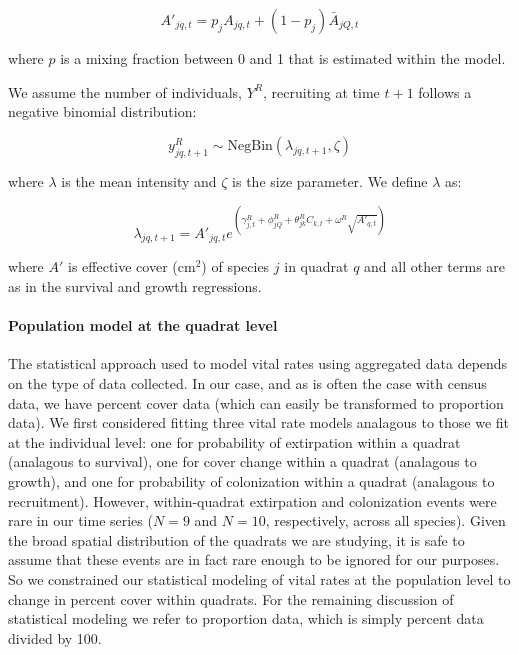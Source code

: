 \documentclass[12pt,]{article}
\begin{document}
\begin{equation}
A'_{jq,t} = p_{j}A_{jq,t} + (1-p_{j})\bar{A}_{jQ,t}
\end{equation}

where $p$ is a mixing fraction between 0 and 1 that is estimated within
the model.

We assume the number of individuals, $Y^{R}$, recruiting at time $t+1$
follows a negative binomial distribution:

\begin{equation}
y^{R}_{jq,t+1} \sim \text{NegBin}(\lambda_{jq,t+1},\zeta)
\end{equation}

where $\lambda$ is the mean intensity and $\zeta$ is the size parameter.
We define $\lambda$ as:

\begin{equation}
\lambda_{jq,t+1} = A'_{jq,t}e^{(\gamma^{R}_{j,t} + \phi^{R}_{jQ} + \theta^{R}_{jk}C_{k,t} + \omega^{R}\sqrt{A'_{q,t}})}
\end{equation}

where $A'$ is effective cover ($\text{cm}^2$) of species $j$ in quadrat
$q$ and all other terms are as in the survival and growth regressions.

\paragraph{Population model at the quadrat
level}\label{population-model-at-the-quadrat-level}

The statistical approach used to model vital rates using aggregated data
depends on the type of data collected. In our case, and as is often the
case with census data, we have percent cover data (which can easily be
transformed to proportion data). We first considered fitting three vital
rate models analagous to those we fit at the individual level: one for
probability of extirpation within a quadrat (analagous to survival), one
for cover change within a quadrat (analagous to growth), and one for
probability of colonization within a quadrat (analagous to recruitment).
However, within-quadrat extirpation and colonization events were rare in
our time series ($N=9$ and $N=10$, respectively, across all species).
Given the broad spatial distribution of the quadrats we are studying, it
is safe to assume that these events are in fact rare enough to be
ignored for our purposes. So we constrained our statistical modeling of
vital rates at the population level to change in percent cover within
quadrats. For the remaining discussion of statistical modeling we refer
to proportion data, which is simply percent data divided by 100.
\end{document}

